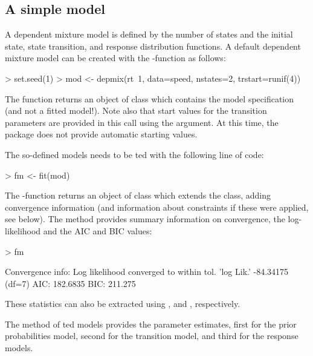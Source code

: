 \documentclass[article]{jss}
\begin{document}
\subsection{A simple model}

A dependent mixture model is defined by the number of states and the initial 
state, state transition, and response distribution functions. A default 
dependent mixture model can be created with the -function as 
follows:

\begin{CodeChunk}
\begin{CodeInput}
> set.seed(1)
> mod <- depmix(rt~1, data=speed, nstates=2, trstart=runif(4))
\end{CodeInput}
\end{CodeChunk}

The  function returns an object of class 
which contains the model specification (and not a fitted model!).
Note also that start values for the transition parameters are provided
in this call using the  argument. At this time, the package does 
not provide automatic starting values. 

The so-defined models needs to be ted with the following
line of code:
\begin{CodeChunk}
\begin{CodeInput}
> fm <- fit(mod)
\end{CodeInput}
\end{CodeChunk}

The -function returns an object of class
 which extends the  class, adding
convergence information (and information about constraints if these
were applied, see below).  The  method provides summary
information on convergence, the log-likelihood and the AIC and BIC
values:
\begin{CodeChunk}
\begin{CodeInput}
> fm
\end{CodeInput}
\begin{CodeOutput}
Convergence info: Log likelihood converged to within tol. 
'log Lik.' -84.34175 (df=7)
AIC:  182.6835 
BIC:  211.275 
\end{CodeOutput}
\end{CodeChunk}
These statistics can also be extracted using ,
 and , respectively.

The  method of ted models provides the parameter
estimates, first for the prior probabilities model, second for the
transition model, and third for the response models.
\end{document}
